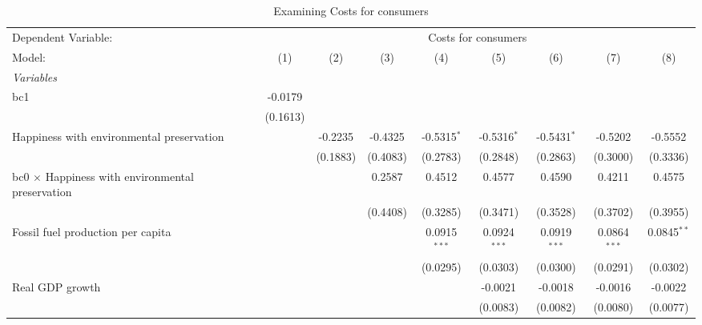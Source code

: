 
\begin{table}[htbp]
   \caption{Examining Costs for consumers}
   \centering
   \begin{tabular}{lcccccccc}
      \tabularnewline \midrule \midrule
      Dependent Variable: & \multicolumn{8}{c}{Costs for consumers}\\
      Model:                                                  & (1)      & (2)      & (3)      & (4)            & (5)            & (6)            & (7)            & (8)\\  
      \midrule
      \emph{Variables}\\
      bc1                                                     & -0.0179  &          &          &                &                &                &                &   \\   
                                                              & (0.1613) &          &          &                &                &                &                &   \\   
      Happiness with environmental preservation               &          & -0.2235  & -0.4325  & -0.5315$^{*}$  & -0.5316$^{*}$  & -0.5431$^{*}$  & -0.5202        & -0.5552\\   
                                                              &          & (0.1883) & (0.4083) & (0.2783)       & (0.2848)       & (0.2863)       & (0.3000)       & (0.3336)\\   
      bc0 $\times$ Happiness with environmental preservation  &          &          & 0.2587   & 0.4512         & 0.4577         & 0.4590         & 0.4211         & 0.4575\\   
                                                              &          &          & (0.4408) & (0.3285)       & (0.3471)       & (0.3528)       & (0.3702)       & (0.3955)\\   
      Fossil fuel production per capita                       &          &          &          & 0.0915$^{***}$ & 0.0924$^{***}$ & 0.0919$^{***}$ & 0.0864$^{***}$ & 0.0845$^{**}$\\   
                                                              &          &          &          & (0.0295)       & (0.0303)       & (0.0300)       & (0.0291)       & (0.0302)\\   
      Real GDP growth                                         &          &          &          &                & -0.0021        & -0.0018        & -0.0016        & -0.0022\\   
                                                              &          &          &          &                & (0.0083)       & (0.0082)       & (0.0080)       & (0.0077)\\   

\end{tabular}
\end{table}
